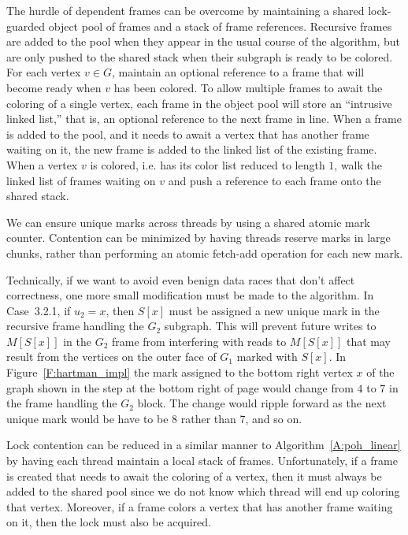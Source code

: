 \documentclass[12pt,letterpaper]{article}
\theoremstyle{plain}
\theoremstyle{definition}
\theoremstyle{break}
\begin{document}
The hurdle of dependent frames can be overcome by maintaining a shared
lock-guarded object pool
of frames and a stack of frame references. Recursive frames are added to the
pool when they appear in the usual course of the algorithm, but
are only pushed to the shared stack when their subgraph is ready to
be colored. For each vertex $v\in G$, maintain an optional reference
to a frame that will become ready when $v$ has been colored. To allow
multiple frames to await the coloring of a single vertex, each frame in the
object pool will store an ``intrusive linked list,'' that is, an optional
reference to the next frame in line. When a frame is added to the pool, and
it needs to await a vertex that has another frame waiting on it,
the new frame is added to the linked list of the existing frame.
When a vertex $v$ is colored, i.e. has its color list reduced to length $1$,
walk the linked list of frames waiting on $v$
and push a reference to each frame onto the shared stack.

We can ensure unique marks across threads by using a shared atomic mark
counter.
Contention can be minimized by having
threads reserve marks in large chunks, rather than performing an
atomic fetch-add operation for each new mark.

Technically, if we want to avoid even benign data races that don't affect
correctness, one more small
modification must be made to the algorithm.
In Case~3.2.1, if $u_2= x$, then $S[x]$ must be assigned a new unique mark
in the recursive frame handling the $G_2$ subgraph. This will
prevent future writes to $M[S[x]]$ in the $G_2$ frame from
interfering with reads to $M[S[x]]$ that may result from the vertices on the
outer face of $G_1$ marked with $S[x]$. In
Figure~\ref{F:hartman_impl} the mark assigned to the bottom
right vertex $x$ of the graph shown in the step at the bottom right of
page would change from $4$ to $7$ in the frame handling the $G_2$ block.
The change would ripple forward as the next unique mark
would be have to be $8$ rather than $7$, and so on.

Lock contention can be reduced in a similar manner to
Algorithm~\ref{A:poh_linear} by having each thread maintain a local stack of
frames. Unfortunately, if a frame is created that needs to await the coloring
of a vertex, then it must always be added to the shared pool since we do not
know which thread will end up coloring that vertex.
Moreover, if a frame colors a
vertex that has another frame waiting on it, then the lock must also be
acquired.
\end{document}
